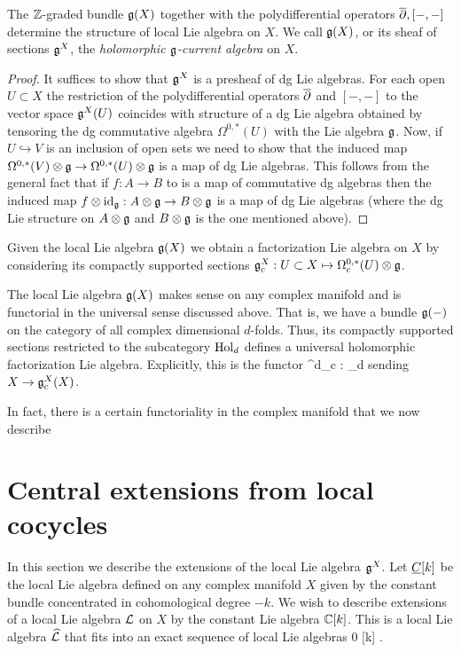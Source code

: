 \documentclass[10pt]{amsart}
\begin{document}
\begin{dfn/lem} The $\mathbb Z$-graded bundle $\mathfrak g(X)$ together with the polydifferential operators $\overline{\partial}, [-,-]$ determine the structure of local Lie algebra on $X$.  We call $\mathfrak g(X)$, or its sheaf of sections $\mathfrak g^X$, the {\em holomorphic $\mathfrak g$-current algebra} on $X$. 
\end{dfn/lem}
\begin{proof} It suffices to show that $\mathfrak g^X$ is a presheaf of dg Lie algebras. For each open $U \subset X$ 
the restriction of the polydifferential operators $\overline{\partial}$ and $[-,-]$ to the vector space $\mathfrak g^X(U)$ coincides with structure of a dg Lie algebra obtained by tensoring the dg commutative algebra $\Omega^{0,*}(U)$ with the Lie algebra $\mathfrak g$. Now, if $U \hookrightarrow V$ is an inclusion of open sets we need to show that the induced map $\Omega^{0,*}(V) \otimes \mathfrak g \to \Omega^{0,*}(U) \otimes \mathfrak g$ is a map of dg Lie algebras. This follows from the general fact that if $f : A \to B$ to is a map of commutative dg algebras then the induced map $f \otimes {\rm id}_{\mathfrak g} : A \otimes \mathfrak g \to B \otimes \mathfrak g$ is a map of dg Lie algebras (where the dg Lie structure on $A \otimes \mathfrak g$ and $B \otimes \mathfrak g$ is the one mentioned above). 
\end{proof}

Given the local Lie algebra $\mathfrak g(X)$ we obtain a factorization Lie algebra on $X$ by considering its compactly supported sections $\mathfrak g_c^X : U \subset X \mapsto \Omega^{0,*}_c(U) \otimes \mathfrak g$. 

The local Lie algebra $\mathfrak g(X)$ makes sense on any complex manifold and is functorial in the universal sense discussed above. That is, we have a bundle $\mathfrak g(-)$ on the category of all complex dimensional $d$-folds. Thus, its compactly supported sections restricted to the subcategory ${\rm Hol}_d$ defines a universal holomorphic factorization Lie algebra. Explicitly, this is the functor
\ben
\fg^d_c : \Hol_d \to \Lcat
\een
sending $X \to \mathfrak g^X_c(X)$. 

In fact, there is a certain functoriality in the complex manifold that we now describe 

\section{Central extensions from local cocycles}

In this section we describe the extensions of the local Lie algebra $\mathfrak g^X$. Let $\underline{C}[k]$ be the local Lie algebra defined on any complex manifold $X$ given by the constant bundle concentrated in cohomological degree $-k$. We wish to describe extensions of a local Lie algebra $\mathcal L$ on $X$ by the constant Lie algebra $\mathbb C[k]$. This is a local Lie algebra $\widehat{\mathcal L}$ that fits into an exact sequence of local Lie algebras
\be\label{kext}
0 \to \ul{\CC}[k] \to \Hat{\cL} \to \cL {} .
\ee
\end{document}
